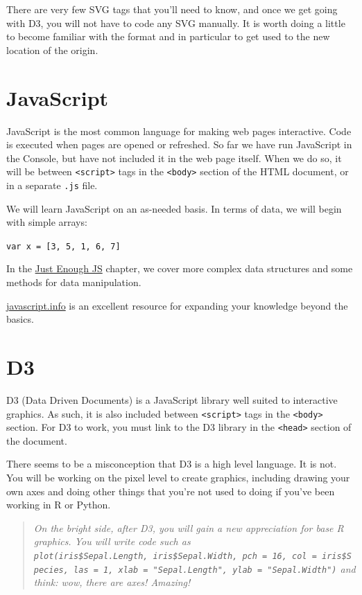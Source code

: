 \documentclass[openany]{book}
\begin{document}
There are very few SVG tags that you'll need to know, and once we get going with D3, you will not have to code any SVG manually. It is worth doing a little to become familiar with the format and in particular to get used to the new location of the origin.

\hypertarget{javascript}{%
\section{JavaScript }\label{javascript}}

JavaScript is the most common language for making web pages interactive. Code is executed when pages are opened or refreshed. So far we have run JavaScript in the Console, but have not included it in the web page itself. When we do so, it will be between \texttt{\textless{}script\textgreater{}} tags in the \texttt{\textless{}body\textgreater{}} section of the HTML document, or in a separate \texttt{.js} file.

We will learn JavaScript on an as-needed basis. In terms of data, we will begin with simple arrays:

\texttt{var\ x\ =\ {[}3,\ 5,\ 1,\ 6,\ 7{]}}

In the \href{just-enough-js.html}{Just Enough JS} chapter, we cover more complex data structures and some methods for data manipulation.

\href{https://javascript.info}{javascript.info} is an excellent resource for expanding your knowledge beyond the basics.

\hypertarget{d3}{%
\section{D3 }\label{d3}}

D3 (Data Driven Documents) is a JavaScript library well suited to interactive graphics. As such, it is also included between \texttt{\textless{}script\textgreater{}} tags in the \texttt{\textless{}body\textgreater{}} section. For D3 to work, you must link to the D3 library in the \texttt{\textless{}head\textgreater{}} section of the document.

There seems to be a misconception that D3 is a high level language. It is not. You will be working on the pixel level to create graphics, including drawing your own axes and doing other things that you're not used to doing if you've been working in R or Python.

\begin{quote}
 \emph{On the bright side, after D3, you will gain a new appreciation for base R graphics. You will write code such as \texttt{plot(iris\$Sepal.Length,\ iris\$Sepal.Width,\ pch\ =\ 16,\ col\ =\ iris\$Species,\ las\ =\ 1,\ xlab\ =\ "Sepal.Length",\ ylab\ =\ "Sepal.Width")} and think: wow, there are axes! Amazing!}
\end{quote}
\end{document}
